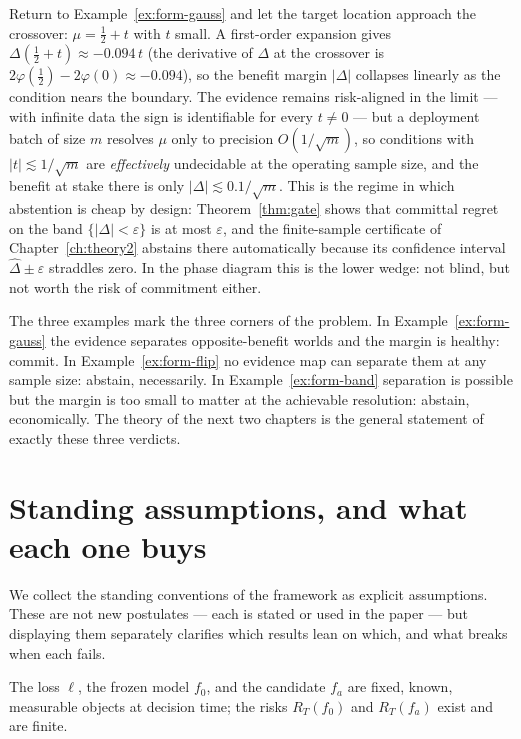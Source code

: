 \begin{example}\label{ex:form-band}
Return to Example~\ref{ex:form-gauss} and let the target location approach
the crossover: $\mu=\tfrac12+t$ with $t$ small. A first-order expansion
gives $\Delta(\tfrac12+t)\approx-0.094\,t$ (the derivative of $\Delta$ at
the crossover is $2\varphi(\tfrac12)-2\varphi(0)\approx-0.094$), so the
benefit margin $|\Delta|$ collapses linearly as the condition nears the
boundary. The evidence remains risk-aligned in the limit --- with infinite
data the sign is identifiable for every $t\neq0$ --- but a deployment batch
of size $m$ resolves $\mu$ only to precision $O(1/\sqrt m)$, so conditions
with $|t|\lesssim1/\sqrt m$ are \emph{effectively} undecidable at the
operating sample size, and the benefit at stake there is only
$|\Delta|\lesssim0.1/\sqrt m$. This is the regime in which abstention is
cheap by design: Theorem~\ref{thm:gate} shows that committal regret on the
band $\{|\Delta|<\varepsilon\}$ is at most $\varepsilon$, and the
finite-sample certificate of Chapter~\ref{ch:theory2} abstains there
automatically because its confidence interval
$\widehat\Delta\pm\varepsilon$ straddles zero. In the phase diagram this is
the lower wedge: not blind, but not worth the risk of commitment either.
\end{example}

The three examples mark the three corners of the problem. In
Example~\ref{ex:form-gauss} the evidence separates opposite-benefit worlds
and the margin is healthy: commit. In Example~\ref{ex:form-flip} no evidence
map can separate them at any sample size: abstain, necessarily. In
Example~\ref{ex:form-band} separation is possible but the margin is too
small to matter at the achievable resolution: abstain, economically. The
theory of the next two chapters is the general statement of exactly these
three verdicts.

\section{Standing assumptions, and what each one buys}\label{sec:form-assumptions}

We collect the standing conventions of the framework as explicit
assumptions. These are not new postulates --- each is stated or used in the
paper --- but displaying them separately clarifies which results lean on
which, and what breaks when each fails.

\begin{assumption}\label{asm:form-triple}
The loss $\ell$, the frozen model $f_0$, and the candidate $f_a$ are fixed,
known, measurable objects at decision time; the risks $R_T(f_0)$ and
$R_T(f_a)$ exist and are finite.
\end{assumption}

